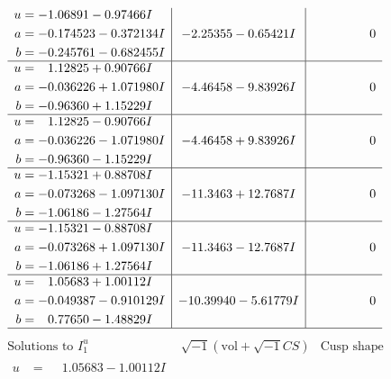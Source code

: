 \documentclass[1p]{elsarticle_modified}
\theoremstyle{definition}
\newcommand{\I}{\sqrt{-1}}
\begin{document}
$$\begin{array}{c|c|c}
\begin{aligned}
u &= -1.06891 - 0.97466 I \\
a &= -0.174523 - 0.372134 I \\
b &= -0.245761 - 0.682455 I\end{aligned}
 & -2.25355 - 0.65421 I & \phantom{-0.000000 } 0 \\ \hline\begin{aligned}
u &= \phantom{-}1.12825 + 0.90766 I \\
a &= -0.036226 + 1.071980 I \\
b &= -0.96360 + 1.15229 I\end{aligned}
 & -4.46458 - 9.83926 I & \phantom{-0.000000 } 0 \\ \hline\begin{aligned}
u &= \phantom{-}1.12825 - 0.90766 I \\
a &= -0.036226 - 1.071980 I \\
b &= -0.96360 - 1.15229 I\end{aligned}
 & -4.46458 + 9.83926 I & \phantom{-0.000000 } 0 \\ \hline\begin{aligned}
u &= -1.15321 + 0.88708 I \\
a &= -0.073268 - 1.097130 I \\
b &= -1.06186 - 1.27564 I\end{aligned}
 & -11.3463 + 12.7687 I & \phantom{-0.000000 } 0 \\ \hline\begin{aligned}
u &= -1.15321 - 0.88708 I \\
a &= -0.073268 + 1.097130 I \\
b &= -1.06186 + 1.27564 I\end{aligned}
 & -11.3463 - 12.7687 I & \phantom{-0.000000 } 0 \\ \hline\begin{aligned}
u &= \phantom{-}1.05683 + 1.00112 I \\
a &= -0.049387 - 0.910129 I \\
b &= \phantom{-}0.77650 - 1.48829 I\end{aligned}
 & -10.39940 - 5.61779 I & \phantom{-0.000000 } 0\\
 \hline 
 \end{array}$$\newpage$$\begin{array}{c|c|c}  
\text{Solutions to }I^u_{1}& \I (\text{vol} + \sqrt{-1}CS) & \text{Cusp shape}\\
 \hline 
\begin{aligned}
u &= \phantom{-}1.05683 - 1.00112 I \\

\end{aligned}
\end{array}$$
\end{document}
